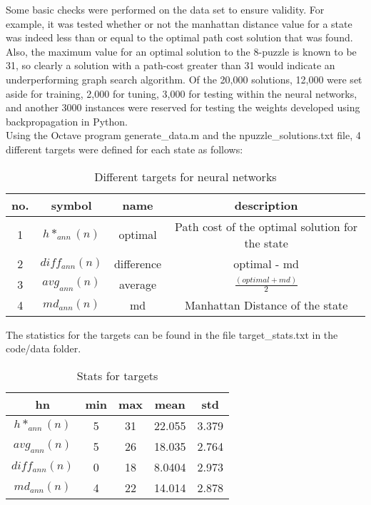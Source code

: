 \documentclass[a4, 12pt]{article}
\begin{document}
Some basic checks were performed on the data set to ensure validity. For example, it was tested whether or not the manhattan distance value for a state was indeed less than or equal to the optimal path cost solution that was found. Also, the maximum value for an optimal solution to the 8-puzzle is known to be 31, so clearly a solution with a path-cost greater than 31 would indicate an underperforming graph search algorithm. 
Of the 20,000 solutions, 12,000 were set aside for training, 2,000 for tuning, 3,000 for testing within the neural networks, and another 3000 instances were reserved for testing the weights developed using backpropagation in Python. \\

Using the Octave program generate\_data.m and the npuzzle\_solutions.txt file, 4 different targets were defined for each state as follows: \\

\begin{table}[H]
\centering
\caption{Different targets for neural networks}
\begin{tabular}{c c c c}
  no. & symbol & name & description \\
\hline
  1 & $h*_{ann}(n)$ & optimal & Path cost of the optimal solution for the state \\
  2 & $diff_{ann}(n)$ & difference & optimal - md \\
  3 & $avg_{ann}(n)$  & average & $\frac{(optimal + md)}{2}$ \\
  4 & $md_{ann}(n)$ & md & Manhattan Distance of the state \\
\end{tabular}
\end{table}

The statistics for the targets can be found in the file target\_stats.txt in the code/data folder. 

\begin{table}[H]
\centering
\caption{Stats for targets}
\begin{tabular}{c c c c c}
 hn & min  & max & mean & std \\
\hline
 $h*_{ann}(n)$ & 5 & 31 & 22.055 & 3.379  \\
 $avg_{ann}(n)$ & 5 & 26 & 18.035 & 2.764\\
 $diff_{ann}(n)$  & 0 & 18 & 8.0404 & 2.973  \\
 $md_{ann}(n)$ & 4 & 22 & 14.014 & 2.878\\
\end{tabular}
\end{table}
\end{document}

